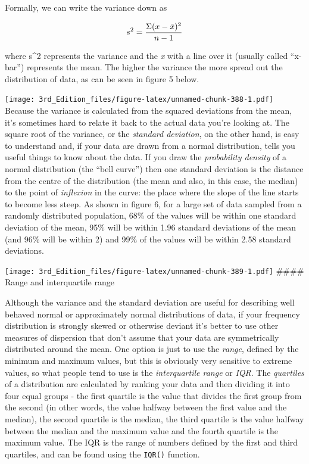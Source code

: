 \documentclass[
]{book}
\begin{document}
Formally, we can write the variance down as

\[\Large s^2 = \frac{\Sigma ( x - \bar{x} )^2}{n-1}\]

where s\^{}2 represents the variance and the \emph{x} with a line over it (usually called ``x-bar'') represents the mean. The higher the variance the more spread out the distribution of data, as can be seen in figure 5 below.

\texttt{[image: 3rd\_Edition\_files/figure-latex/unnamed-chunk-388-1.pdf]}
Because the variance is calculated from the squared deviations from the mean, it's sometimes hard to relate it back to the actual data you're looking at. The square root of the variance, or the \emph{standard deviation}, on the other hand, is easy to understand and, if your data are drawn from a normal distribution, tells you useful things to know about the data. If you draw the \emph{probability density} of a normal distribution (the ``bell curve'') then one standard deviation is the distance from the centre of the distribution (the mean and also, in this case, the median) to the point of \emph{inflexion} in the curve: the place where the slope of the line starts to become less steep. As shown in figure 6, for a large set of data sampled from a randomly distributed population, 68\% of the values will be within one standard deviation of the mean, 95\% will be within 1.96 standard deviations of the mean (and 96\% will be within 2) and 99\% of the values will be within 2.58 standard deviations.

\texttt{[image: 3rd\_Edition\_files/figure-latex/unnamed-chunk-389-1.pdf]}
\#\#\#\# Range and interquartile range

Although the variance and the standard deviation are useful for describing well behaved normal or approximately normal distributions of data, if your frequency distribution is strongly skewed or otherwise deviant it's better to use other measures of dispersion that don't assume that your data are symmetrically distributed around the mean. One option is just to use the \emph{range}, defined by the minimum and maximum values, but this is obviously very sensitive to extreme values, so what people tend to use is the \emph{interquartile range} or \emph{IQR}. The \emph{quartiles} of a distribution are calculated by ranking your data and then dividing it into four equal groups - the first quartile is the value that divides the first group from the second (in other words, the value halfway between the first value and the median), the second quartile is the median, the third quartile is the value halfway between the median and the maximum value and the fourth quartile is the maximum value. The IQR is the range of numbers defined by the first and third quartiles, and can be found using the \texttt{IQR()} function.
\end{document}

